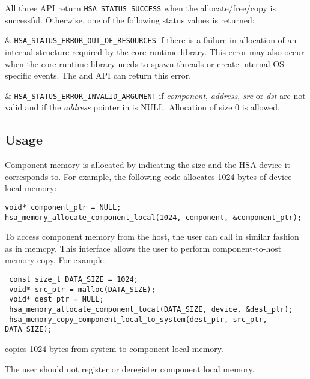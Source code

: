All three API return \texttt{HSA\_STATUS\_SUCCESS} when the
allocate/free/copy is successful. Otherwise, one of the following
status values is returned:

\begin{easylist}

& \texttt{HSA\_STATUS\_ERROR\_OUT\_OF\_RESOURCES} if there is a
failure in allocation of an internal structure required by the core
runtime library. This error may also occur when the core runtime
library needs to spawn threads or create internal OS-specific
events. The  and
 API can
return this error. 

& \texttt{HSA\_STATUS\_ERROR\_INVALID\_ARGUMENT} if {\itshape
component}, {\itshape address}, {\itshape src} or {\itshape dst} are
not valid and if the {\itshape address} pointer in
 is NULL. Allocation
of size 0 is allowed. 

\end{easylist}

\hypertarget{coreapi_device_memory_usage}{}\subsection{Usage}\label{coreapi_device_memory_usage}

Component memory is allocated by indicating the size and the H\-S\-A
device it corresponds to. For example, the following code allocates
1024 bytes of device local memory\-:

\begin{framed}
\begin{lstlisting}
void* component_ptr = NULL;
hsa_memory_allocate_component_local(1024, component, &component_ptr);
\end{lstlisting}
\end{framed}

To access component memory from the host, the user can call
 in similar
fashion as in memcpy. This interface allows the user to
perform component-\/to-\/host memory copy. For example\-:

\begin{framed}
\begin{lstlisting}
 const size_t DATA_SIZE = 1024;
 void* src_ptr = malloc(DATA_SIZE);
 void* dest_ptr = NULL;
 hsa_memory_allocate_component_local(DATA_SIZE, device, &dest_ptr);
 hsa_memory_copy_component_local_to_system(dest_ptr, src_ptr, DATA_SIZE);
\end{lstlisting}
\end{framed}

copies 1024 bytes from system to component local memory.

The user should not register or deregister component local memory. 

